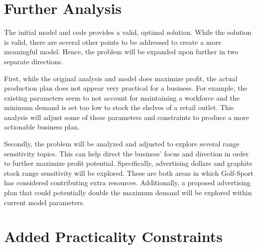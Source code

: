 \documentclass{article}
\begin{document}
\section{Further Analysis}
The initial model and code provides a valid, optimal solution.  While the solution is valid, there are several other points to be addressed to create a more meaningful model.  Hence, the problem will be expanded upon further in two separate directions.
\par
First, while the original analysis and model does maximize profit, the actual production plan does not appear very practical for a business.  
For example, the existing parameters seem to not account for maintaining a workforce and the minimum demand is set too low to stock the shelves of a retail outlet.  This analysis will adjust some of these parameters and constraints to produce a more 
actionable business plan.
\par
Secondly, the problem will be analyzed and adjusted to explore several range sensitivity topics.  This can help direct the business' focus and direction in order to further maximize profit potential.  Specifically, advertising dollars and graphite stock range sensitivity will be explored.  These are both areas in which Golf-Sport has considered contributing extra resources.  Additionally, a proposed advertising plan 
that could potentially double the maximum demand will be explored within current model parameters.
\section{Added Practicality Constraints}
\end{document}

